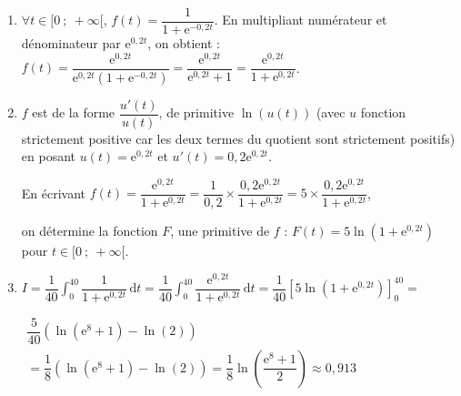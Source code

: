 \documentclass[10pt]{article}
\providecommand{\e}{{\mathrm{e}}}
\begin{document}
\begin{enumerate}
	\item $\forall t \in [0~;~+\infty[$, $f(t) = \dfrac{1}{1+ \e^{-0,2t}}$. En multipliant numérateur et dénominateur par $\e^{0,2t}$, on obtient : $f(t)=\dfrac{\e^{0,2t}}{\e^{0,2t}(1+ \e^{-0,2t})}= \dfrac{\e^{0,2t}}{\e^{0,2t} + 1} = \dfrac{\e^{0,2t}}{1 + \e^{0,2t}}$.
	\item $f$ est de la forme $\dfrac{u'(t)}{u(t)}$, de primitive $\ln(u(t))$ (avec $u$ fonction strictement positive car les deux termes du quotient sont strictement positifs) en posant $u(t)=\e^{0,2t}$ et $u'(t)= 0,2\e^{0,2t}$.

En écrivant $f(t)=\dfrac{\e^{0,2t}}{1 + \e^{0,2t}}=\dfrac{1}{0,2}\times \dfrac{0,2\e^{0,2t}}{1 + \e^{0,2t}}=5\times \dfrac{0,2\e^{0,2t}}{1 + \e^{0,2t}}$,

on détermine la fonction $F$, une primitive de $f$ : $F(t)= 5\ln\left(1 + \e^{0,2t}\right)$ pour $t \in [0~;~+\infty[$.
	\item $I = \dfrac{1}{40}\displaystyle\int_0^{40} \dfrac{1}{1 + \e^{0,2t}}\,\text{d}t = \dfrac{1}{40}\displaystyle\int_0^{40} \dfrac{\e^{0,2t}}{1 + \e^{0,2t}} \,\text{d}t =\dfrac{1}{40}\left[5\ln\left(1 + \e^{0,2t}\right)\right]_0^{40}=$

$\begin{gathered}\dfrac{5}{40}\left(\ln\left(\e^8+1\right)-\ln(2)\right)\\=\dfrac{1}{8}\left(\ln\left(\e^8+1\right)-\ln(2)\right)=\dfrac{1}{8} \ln\left(\dfrac{\e^8+1}{2}\right)\approx 0,913\end{gathered}$
\end{enumerate}
\end{document}
